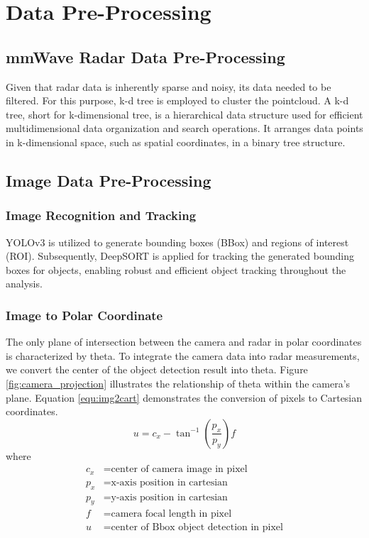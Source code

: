 \section{Data Pre-Processing}\label{sec:2-preprocessing}
\subsection{mmWave Radar Data Pre-Processing}\label{sec:2-kd_tree}
Given that radar data is inherently sparse and noisy, its data needed to be filtered.
For this purpose, k-d tree is employed to cluster the pointcloud.
A k-d tree, short for k-dimensional tree, is a hierarchical data structure used for efficient multidimensional data organization and search operations. 
It arranges data points in k-dimensional space, such as spatial coordinates, in a binary tree structure. 

\subsection{Image Data Pre-Processing}\label{sec:2-img_recognition}
\subsubsection{Image Recognition and Tracking}
YOLOv3 is utilized to generate bounding boxes (BBox) and regions of interest (ROI)\cite{redmon2018yolov3}.
Subsequently, DeepSORT is applied for tracking the generated bounding boxes for objects, 
enabling robust and efficient object tracking throughout the analysis\cite{Wojke2017simple}.

\subsubsection{Image to Polar Coordinate}
The only plane of intersection between the camera and radar in polar coordinates is characterized by theta. 
To integrate the camera data into radar measurements, 
we convert the center of the object detection result into theta. 
Figure \ref{fig:camera_projection} illustrates the relationship of theta within the camera's plane. 
Equation \ref{equ:img2cart} demonstrates the conversion of pixels to Cartesian coordinates.
\begin{equation}\label{equ:img2cart}
u=c_x-\tan^{-1}(\frac{p_x}{p_y})f
\end{equation}
where
\begin{align*}
    c_x &=\text{center of camera image in pixel}\\
    p_x &=\text{x-axis position in cartesian}\\
    p_y &=\text{y-axis position in cartesian}\\
    f &=\text{camera focal length in pixel}\\
    u &=\text{center of Bbox object detection in pixel}
\end{align*}

